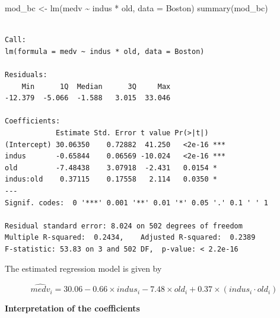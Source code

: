 \documentclass[
  12pt,
  a4paper,
]{scrbook}
\newenvironment{Shaded}{\begin{snugshade}}{\end{snugshade}}
\newcommand{\AttributeTok}[1]{\textcolor[rgb]{0.40,0.45,0.13}{#1}}
\newcommand{\FunctionTok}[1]{\textcolor[rgb]{0.28,0.35,0.67}{#1}}
\newcommand{\NormalTok}[1]{\textcolor[rgb]{0.00,0.23,0.31}{#1}}
\newcommand{\OtherTok}[1]{\textcolor[rgb]{0.00,0.23,0.31}{#1}}
\newcommand{\SpecialCharTok}[1]{\textcolor[rgb]{0.37,0.37,0.37}{#1}}
\theoremstyle{plain}
\theoremstyle{definition}
\theoremstyle{remark}
\begin{document}
\begin{Shaded}
\begin{Highlighting}[]
\NormalTok{mod\_bc }\OtherTok{\textless{}{-}} \FunctionTok{lm}\NormalTok{(medv }\SpecialCharTok{\textasciitilde{}}\NormalTok{ indus }\SpecialCharTok{*}\NormalTok{ old, }\AttributeTok{data =}\NormalTok{ Boston)}
\FunctionTok{summary}\NormalTok{(mod\_bc)}
\end{Highlighting}
\end{Shaded}

\begin{verbatim}

Call:
lm(formula = medv ~ indus * old, data = Boston)

Residuals:
    Min      1Q  Median      3Q     Max 
-12.379  -5.066  -1.588   3.015  33.046 

Coefficients:
            Estimate Std. Error t value Pr(>|t|)    
(Intercept) 30.06350    0.72882  41.250   <2e-16 ***
indus       -0.65844    0.06569 -10.024   <2e-16 ***
old         -7.48438    3.07918  -2.431   0.0154 *  
indus:old    0.37115    0.17558   2.114   0.0350 *  
---
Signif. codes:  0 '***' 0.001 '**' 0.01 '*' 0.05 '.' 0.1 ' ' 1

Residual standard error: 8.024 on 502 degrees of freedom
Multiple R-squared:  0.2434,    Adjusted R-squared:  0.2389 
F-statistic: 53.83 on 3 and 502 DF,  p-value: < 2.2e-16
\end{verbatim}

The estimated regression model is given by

\[
\widehat{medv}_i = 30.06 - 0.66 \times indus_i - 7.48 \times old_i + 0.37 \times (indus_i \cdot old_i)
\]

{\textbf{Interpretation of the coefficients}}
\end{document}
